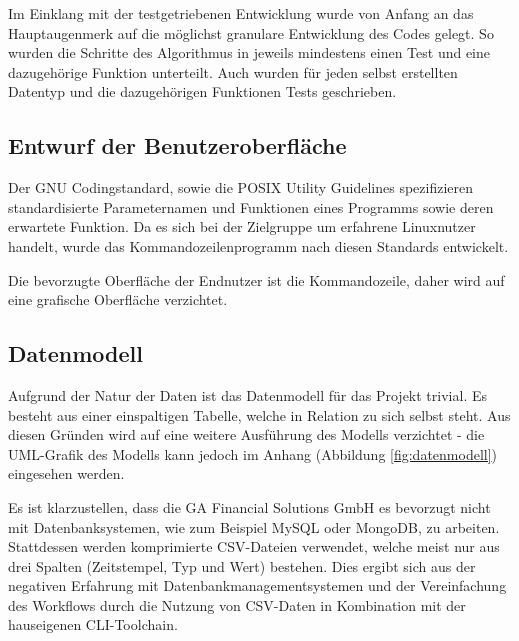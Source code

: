 Im Einklang mit der testgetriebenen Entwicklung wurde von Anfang an das Hauptaugenmerk
auf die möglichst granulare Entwicklung des Codes gelegt. So wurden die Schritte
des Algorithmus in jeweils mindestens einen Test und eine dazugehörige Funktion unterteilt.
Auch wurden für jeden selbst erstellten Datentyp und die dazugehörigen Funktionen Tests geschrieben.




\subsection{Entwurf der Benutzeroberfläche}
Der GNU Codingstandard\cite{gnuCodingStandard},
sowie die POSIX Utility Guidelines\cite{posixGuidelines}
spezifizieren standardisierte Parameternamen und Funktionen eines Programms sowie
deren erwartete Funktion. Da es sich bei der Zielgruppe um erfahrene Linuxnutzer handelt, wurde das Kommandozeilenprogramm nach diesen Standards entwickelt.\par

Die bevorzugte Oberfläche der Endnutzer ist die Kommandozeile, daher wird auf eine grafische Oberfläche verzichtet.

\subsection{Datenmodell}
Aufgrund der Natur der Daten ist das Datenmodell für das Projekt trivial. Es besteht aus einer
einspaltigen Tabelle, welche in Relation zu sich selbst steht. Aus diesen Gründen wird auf eine weitere Ausführung des 
Modells verzichtet - die UML-Grafik des Modells kann jedoch im Anhang (Abbildung \ref{fig:datenmodell}) eingesehen werden.

Es ist klarzustellen, dass die GA Financial Solutions GmbH es bevorzugt nicht mit Datenbanksystemen, wie
 zum Beispiel MySQL oder MongoDB, zu arbeiten. Stattdessen werden komprimierte CSV-Dateien verwendet, welche
meist nur aus drei Spalten (Zeitstempel, Typ und Wert) bestehen. Dies ergibt sich aus
der negativen Erfahrung mit Datenbankmanagementsystemen und der Vereinfachung des Workflows durch
die Nutzung von CSV-Daten in Kombination mit der hauseigenen CLI-Toolchain.


